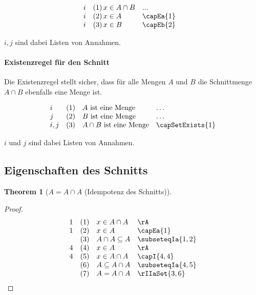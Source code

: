 \documentclass{book}
\theoremstyle{plain}
\newtheorem{theorem}{Theorem}
\theoremstyle{remark}
\theoremstyle{definition}
\begin{document}
\[
\begin{array}{llll}
	i & (1) \, x \in A \cap B & ... & \\
	i & (2) \, x \in A & \capEa{1} \\
	i & (3) \, x \in B & \capEb{2} \\
\end{array}
\]

\(i,j\) sind dabei Listen von Annahmen.

\paragraph{Existenzregel für den Schnitt}
\label{rule:capSetExists}
Die Existenzregel stellt sicher, dass für alle Mengen \(A\) und \(B\) die Schnittmenge \(A\cap B\) ebenfalls eine Menge ist.

\[
\begin{array}{llll}
	i & (1) & A \text{ ist eine Menge} & \dots  \\
        j & (2) & B \text{ ist eine Menge} & \dots  \\
	i,j & (3) & A\cap B\text{ ist eine Menge} & \capSetExists{1} \\
\end{array}
\]

\(i\) und \(j\) sind dabei Listen von Annahmen.
\subsection{Eigenschaften des Schnitts}

\label{AEqualsAcaA}
\begin{theorem}[\(A = A \cap A\) (Idempotenz des Schnitts)]
\end{theorem}

\begin{proof}
	\[
	\begin{array}{llll}
		1 & (1) & x \in A \cap A  & \rA \\
		1 & (2) & x \in A & \capEa{1} \\
		& (3) & A\cap A\subseteq A & \subseteqIa{1,2}\\
		4 & (4) & x \in A  & \rA \\
		4 & (5) & x \in A\cap A  & \capI{4,4} \\
		& (6) & A\subseteq A\cap A  & \subseteqIa{4,5} \\			
		& (7) & A = A\cap A  & \rIIaSet{3,6} \\						  
	\end{array}
	\]
\end{proof}
\end{document}
